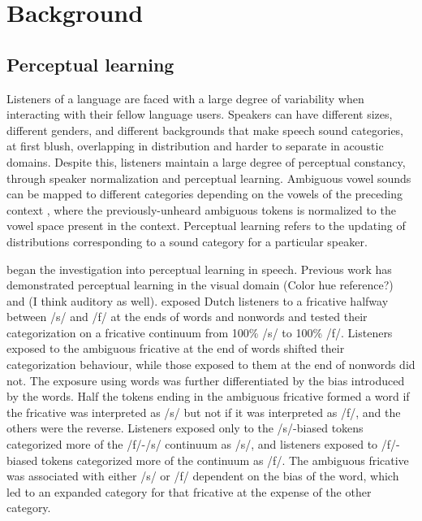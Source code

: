 
\chapter{Background}

\section{Perceptual learning}


Listeners of a language are faced with a large degree of variability when interacting with their fellow language users.  
Speakers can have different sizes, different genders, and different backgrounds that make speech sound categories, at first blush, overlapping in distribution and harder to separate in acoustic domains.
Despite this, listeners maintain a large degree of perceptual constancy, through speaker normalization and perceptual learning.  
Ambiguous vowel sounds can be mapped to different categories depending on the vowels of the preceding context \citep{Ladefoged1957}, where the previously-unheard ambiguous tokens is normalized to the vowel space present in the context.  
Perceptual learning refers to the updating of distributions corresponding to a sound category for a particular speaker.

\citet{Norris2003} began the investigation into perceptual learning in speech. Previous work has demonstrated perceptual learning in the visual domain (Color hue reference?) and (I think auditory as well).  
\citet{Norris2003} exposed Dutch listeners to a fricative halfway between /s/ and /f/ at the ends of words and nonwords and tested their categorization on a fricative continuum from 100\% /s/ to 100\% /f/. 
 Listeners exposed to the ambiguous fricative at the end of words shifted their categorization behaviour, while those exposed to them at the end of nonwords did not.  The exposure using words was further differentiated by the bias introduced by the words.  
Half the tokens ending in the ambiguous fricative formed a word if the fricative was interpreted as /s/ but not if it was interpreted as /f/, and the others were the reverse.  
Listeners exposed only to the /s/-biased tokens categorized more of the /f/-/s/ continuum as /s/, and listeners exposed to /f/-biased tokens categorized more of the continuum as /f/.  
The ambiguous fricative was associated with either /s/ or /f/ dependent on the bias of the word, which led to an expanded category for that fricative at the expense of the other category.

